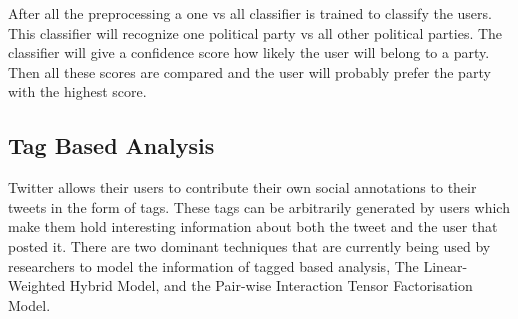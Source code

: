 \documentclass{article}
\begin{document}
After all the preprocessing a one vs all classifier is trained to classify the users. This classifier will recognize one political party vs all other political parties. The classifier will give a confidence score how likely the user will belong to a party. Then all these scores are compared and the user will probably prefer the party with the highest score.  \cite{pol}
\subsection{Tag Based Analysis}

Twitter allows their users to contribute their own social annotations to their tweets in the form of tags. These tags can be arbitrarily generated by users 
which make them hold interesting information about both the tweet and the user that posted it. There are two dominant techniques that are currently being
used by researchers to model the information of tagged based analysis, The Linear-Weighted Hybrid Model, and the Pair-wise Interaction Tensor Factorisation Model\cite{TagBased}.
\end{document}
